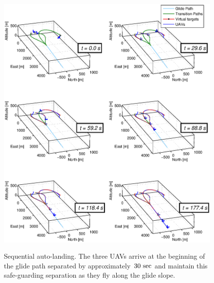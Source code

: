\documentclass[letter,onecolumn,12pt]{aiaa-tc}
\newcommand{\1}{1_n}
\begin{document}
\begin{figure}[p]
    \centering
    \includegraphics[width=\textwidth]{figures/CPF/Scen2_cpf3D.eps}\\[-5ex]
    \caption[Sequential auto-landing; mission evolution.]{Sequential auto-landing. The three UAVs arrive at the beginning of the glide path separated by approximately~$30~{\rm sec}$ and maintain this safe-guarding separation as they fly along the glide slope.}
    \label{fig:ScenCPF_CPFsequence}
\end{figure}
\end{document}
